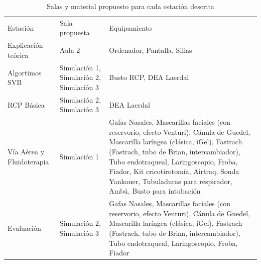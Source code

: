 \begin{table}[hptb]
    \centering
    \begin{tabular}{N{0.24\textwidth}N{0.15\textwidth}M{0.54\textwidth}}
        {\color[HTML]{FFFFFF} Estación} & {\color[HTML]{FFFFFF} Sala propuesta} & {\color[HTML]{FFFFFF} Equipamiento} \\
        Explicación teórica & Aula 2 & Ordenador, Pantalla, Sillas \\
            Algortimos SVB & Simulación 1, Simulación 2, Simulación 3 & Busto RCP, DEA Laerdal \\
        RCP Básica & Simulación 2, Simulación 3 & DEA Laerdal \\
            Vía Aérea y Fluidoterapia & Simulación 1 & Gafas Nasales, Mascarillas faciales (con reservorio, efecto Venturi), Cánula de Guedel, Mascarilla laríngea (clásica, iGel), Fastrach (Fastrach, tubo de Brian, intercambiador), Tubo endotraqueal, Laringoscopio, Froba, Fiador, Kit cricotirotomía, Airtraq, Sonda Yankauer, Tubuladuras para respirador, Ambú, Busto para intubación\\
        Evaluación & Simulación 2, Simulación 3 & Gafas Nasales, Mascarillas faciales (con reservorio, efecto Venturi), Cánula de Guedel, Mascarilla laríngea (clásica, iGel), Fastrach (Fastrach, tubo de Brian, intercambiador), Tubo endotraqueal, Laringoscopio, Froba, Fiador \\ \hline
    \end{tabular}
    \caption{Salas y material propuesto para cada estación descrita}
    \label{tab:Brusilov:SVB:SalasEstaciones}
\end{table}
